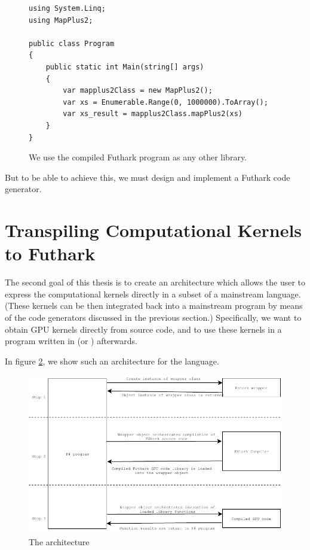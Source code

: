 \begin{figure}[H]
  \centering
\begin{verbatim}
using System.Linq;
using MapPlus2;

public class Program
{
    public static int Main(string[] args)
    {
        var mapplus2Class = new MapPlus2();
        var xs = Enumerable.Range(0, 1000000).ToArray();
        var xs_result = mapplus2Class.mapPlus2(xs)
    }
}
\end{verbatim}
  \caption{We use the compiled Futhark program as any other library.}
  \label{fig:shortfutharkprogram5}
\end{figure}

But to be able to achieve this, we must design and implement a Futhark \csharp{}
code generator.

\section{Transpiling \fsharp{} Computational Kernels to Futhark}

The second goal of this thesis is to create an architecture which allows the
user to express the computational kernels directly in a subset of a mainstream
language. (These kernels can be then integrated back into a mainstream 
program by means of the code generators discussed in the previous section.)
Specifically, we want to obtain GPU kernels directly from \fsharp{} source 
code, and to use these kernels in a program written in \fsharp{} (or \csharp{}) 
afterwards.

In figure \ref{fig:fsharkcompiler}, we show such an architecture for the \fsharp{} language.

\begin{figure}[H]
  \centering
  \includegraphics{chapters/figs/fsharkarchitecture.pdf}
  \caption{The \fshark{} architecture}
  \label{fig:fsharkcompiler}
\end{figure}

